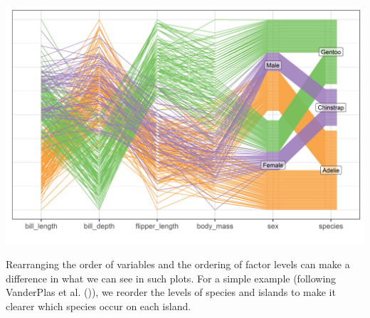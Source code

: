 \documentclass[
  letterpaper,
  10pt,
  krantz2]{krantz}
\begin{document}
\begin{center}
\includegraphics[width=18in,height=\textheight]{figs/fig-peng-ggpcp1-1.png}
\end{center}

Rearranging the order of variables and the ordering of factor levels can
make a difference in what we can see in such plots. For a simple example
(following VanderPlas et al. ()), we
reorder the levels of species and islands to make it clearer which
species occur on each island.
\end{document}
